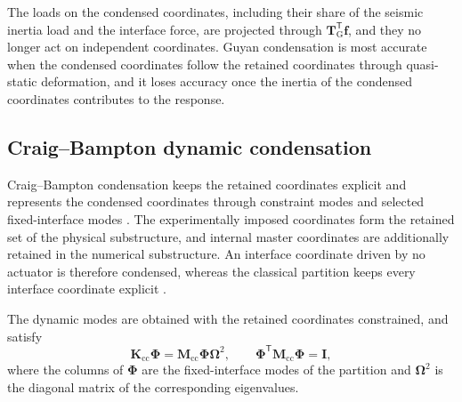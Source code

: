 \documentclass[a4paper,fleqn,review,12pt]{cas-sc}
\numberwithin{equation}{section}
\begin{document}
The loads on the condensed coordinates, including their share of the seismic inertia load and the interface force, are projected through \(\mathbf{T}_{\mathrm{G}}^{\mathsf{T}}\bm{f}\), and they no longer act on independent coordinates. Guyan condensation is most accurate when the condensed coordinates follow the retained coordinates through quasi-static deformation, and it loses accuracy once the inertia of the condensed coordinates contributes to the response.

\subsection{Craig--Bampton dynamic condensation}
\label{sec:cb-condensation}

Craig--Bampton condensation keeps the retained coordinates explicit and represents the condensed coordinates through constraint modes and selected fixed-interface modes \cite{CraigBampton1968}. The experimentally imposed coordinates form the retained set of the physical substructure, and internal master coordinates are additionally retained in the numerical substructure. An interface coordinate driven by no actuator is therefore condensed, whereas the classical partition keeps every interface coordinate explicit \cite{Krattiger2019}.

The dynamic modes are obtained with the retained coordinates constrained, and satisfy
\begin{equation}
  \mathbf{K}_{\mathrm{cc}}\bm{\Phi}
  =\mathbf{M}_{\mathrm{cc}}\bm{\Phi}\bm{\Omega}^{2},
  \qquad
  \bm{\Phi}^{\mathsf{T}}\mathbf{M}_{\mathrm{cc}}\bm{\Phi}=\mathbf{I},
  \label{eq:fixed-interface-modes}
\end{equation}
where the columns of \(\bm{\Phi}\) are the fixed-interface modes of the partition and \(\bm{\Omega}^{2}\) is the diagonal matrix of the corresponding eigenvalues.
\end{document}
